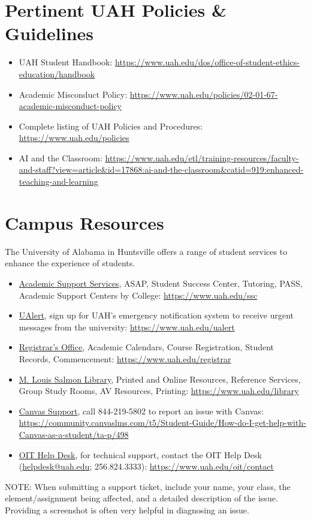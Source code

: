 \documentclass[11pt]{report}
\begin{document}
\chapter{Pertinent UAH Policies \& Guidelines}
\begin{itemize}
    \item UAH Student Handbook: \url{https://www.uah.edu/dos/office-of-student-ethics-education/handbook}
    \item Academic Misconduct Policy: \url{https://www.uah.edu/policies/02-01-67-academic-misconduct-policy}
    \item Complete listing of UAH Policies and Procedures: \url{https://www.uah.edu/policies}
    \item AI and the Classroom: \url{https://www.uah.edu/etl/training-resources/faculty-and-staff?view=article&id=17868:ai-and-the-classroom&catid=919:enhanced-teaching-and-learning}
\end{itemize}

\chapter{Campus Resources}
The University of Alabama in Huntsville offers a range of student services to enhance the experience of students.
\begin{itemize}
    \item \href{https://www.uah.edu/ssc}{Academic Support Services}, ASAP, Student Success Center, Tutoring, PASS, Academic Support Centers by College: \url{https://www.uah.edu/ssc}
    \item \href{https://www.uah.edu/ualert}{UAlert}, sign up for UAH's emergency notification system to receive urgent messages from the university: \url{https://www.uah.edu/ualert}
    \item \href{https://www.uah.edu/registrar}{Registrar's Office}, Academic Calendars, Course Registration, Student Records, Commencement: \url{https://www.uah.edu/registrar}
    \item \href{https://www.uah.edu/library}{M. Louis Salmon Library}, Printed and Online Resources, Reference Services, Group Study Rooms, AV Resources, Printing: \url{https://www.uah.edu/library}
    \item \href{https://community.canvaslms.com/t5/Student-Guide/How-do-I-get-help-with-Canvas-as-a-student/ta-p/498}{Canvas Support}, call 844-219-5802 to report an issue with Canvas: \url{https://community.canvaslms.com/t5/Student-Guide/How-do-I-get-help-with-Canvas-as-a-student/ta-p/498}
    \item \href{https://www.uah.edu/oit/contact}{OIT Help Desk}, for technical support, contact the OIT Help Desk (\href{mailto:helpdesk@uah.edu}{helpdesk@uah.edu}; 256.824.3333): \url{https://www.uah.edu/oit/contact}
\end{itemize}

\vspace{8pt}
\noindent NOTE: When submitting a support ticket, include your name, your class, the element/assignment being affected, and a detailed description of the issue. Providing a screenshot is often very helpful in diagnosing an issue.
\end{document}
